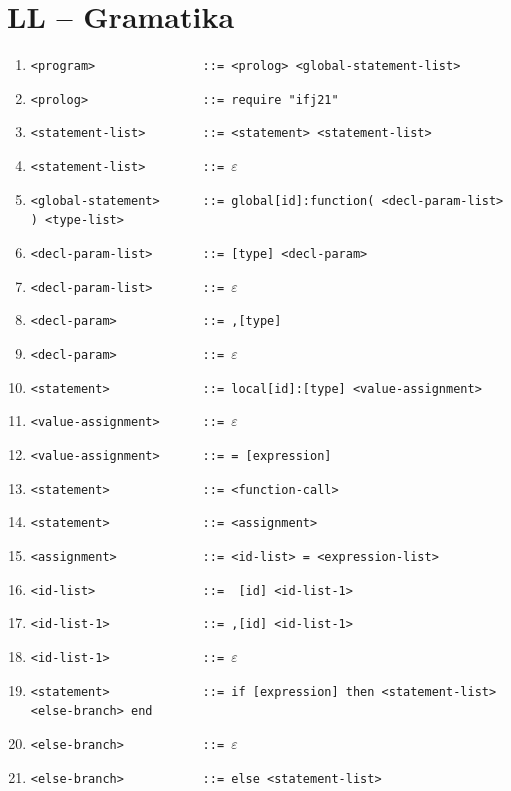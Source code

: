 \documentclass[11pt]{article}
\begin{document}
    \section{LL -- Gramatika}
        \begin{enumerate}[noitemsep]
            \small
            \item\verb|<program>               ::= <prolog> <global-statement-list>|
            \item\verb|<prolog>                ::= require "ifj21"|
            \item\verb|<statement-list>        ::= <statement> <statement-list>|
            \item\verb|<statement-list>        ::= |$\varepsilon$
            \item\verb|<global-statement>      ::= global[id]:function( <decl-param-list> ) <type-list>|
            \item\verb|<decl-param-list>       ::= [type] <decl-param>|
            \item\verb|<decl-param-list>       ::= |$\varepsilon$
            \item\verb|<decl-param>            ::= ,[type]|
            \item\verb|<decl-param>            ::= |$\varepsilon$
            \item\verb|<statement>             ::= local[id]:[type] <value-assignment>|
            \item\verb|<value-assignment>      ::= |$\varepsilon$
            \item\verb|<value-assignment>      ::= = [expression]|
            \item\verb|<statement>             ::= <function-call>| 
            \item\verb|<statement>             ::= <assignment>| 
            \item\verb|<assignment>            ::= <id-list> = <expression-list>| 
            \item\verb|<id-list>               ::=  [id] <id-list-1>| 
            \item\verb|<id-list-1>             ::= ,[id] <id-list-1>| 
            \item\verb|<id-list-1>             ::= |$\varepsilon$ 
            \item\verb|<statement>             ::= if [expression] then <statement-list> <else-branch> end| 
            \item\verb|<else-branch>           ::= |$\varepsilon$ 
            \item\verb|<else-branch>           ::= else <statement-list>| 

\end{enumerate}
\end{document}
